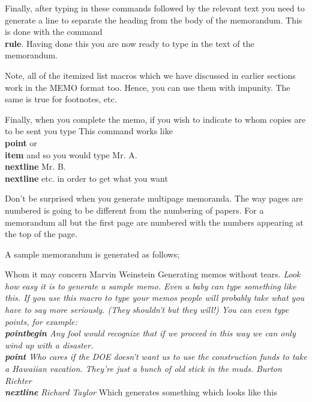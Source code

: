 Finally, after typing in these commands followed by the relevant
text you need to generate a line to separate the heading from the
body of the memorandum.
This is done with the command {\bf \\rule}.
Having done this you are now ready to type in the text of the memorandum.
 
Note, all of the itemized list macros which we have discussed
in earlier sections work in the MEMO format too.
Hence, you can use them with impunity.
The same is true for footnotes, etc.
 
Finally, when you complete the memo, if you wish to indicate to whom
copies are to be sent you type
\tc{\\copies}
This command works like {\bf \\point} or {\bf \\item}
and so you would type
\tc{\\copies}
Mr. A. {\bf \\nextline} \nextline
Mr. B. {\bf \\nextline} \nextline
etc. \nextline
in order to get what you want
 
Don't be surprised when you generate multipage memoranda.
The way pages are numbered is going to be different from the
numbering of papers.
For a memorandum all but the first page are numbered with the numbers
appearing at the top of the page.
 
A sample memorandum is generated as follows; \nextline
 
\vbox{\tc{\\MEMO}
\tc{\\to}
Whom it may concern
\tc{\\from}
Marvin Weinstein
\tc{\\subject}
Generating memos without tears.
\tc{\\rule}
{\it
Look how easy it is to generate a sample memo.
Even a baby can type something like this.
If you use this macro to type your memos people will probably
take what you have to say more seriously.
(They shouldn't but they will!)
You can even type points, for example: \nextline
{\bf \\pointbegin} \nextline
Any fool would recognize that if we proceed in this way we can only
wind up with a disaster. \nextline
{\bf \\point} \nextline
Who cares if the DOE doesn't want us to use the construction funds
to take a Hawaiian vacation.  They're just a bunch of old stick in the
muds. }
\tc{\\copies}
{\it Burton Richter \bf \\nextline} \nextline
{\it Richard Taylor }
\tc{\\endpage}
Which generates something which looks like this}
 
